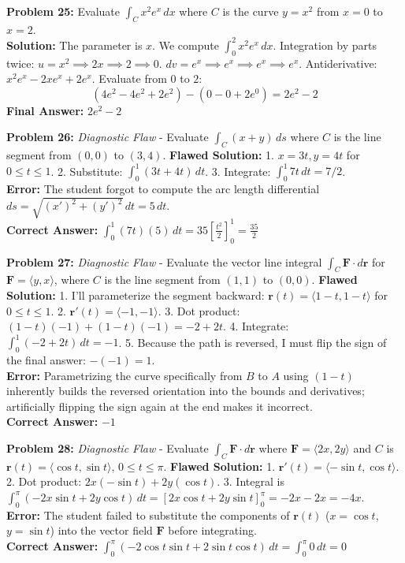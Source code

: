 \documentclass[11pt]{article}
\begin{document}
\textbf{Problem 25:} Evaluate $\int_C x^2e^x \,dx$ where $C$ is the curve $y = x^2$ from $x=0$ to $x=2$.
\\
\textbf{Solution:} The parameter is $x$. We compute $\int_0^2 x^2 e^x \,dx$.
Integration by parts twice: $u=x^2 \implies 2x \implies 2 \implies 0$. $dv=e^x \implies e^x \implies e^x \implies e^x$.
Antiderivative: $x^2e^x - 2xe^x + 2e^x$.
Evaluate from $0$ to $2$:
$$ (4e^2 - 4e^2 + 2e^2) - (0 - 0 + 2e^0) = 2e^2 - 2 $$
\textbf{Final Answer:} $2e^2 - 2$
\vspace{0.5cm}

\textbf{Problem 26:} \textit{Diagnostic Flaw} - Evaluate $\int_C (x+y) \,ds$ where $C$ is the line segment from $(0,0)$ to $(3,4)$. 
\textbf{Flawed Solution:} 1. $x = 3t, y = 4t$ for $0 \le t \le 1$. 2. Substitute: $\int_0^1 (3t + 4t) \,dt$. 3. Integrate: $\int_0^1 7t \,dt = 7/2$.
\\
\textbf{Error:} The student forgot to compute the arc length differential $ds = \sqrt{(x')^2+(y')^2} \,dt = 5 \,dt$. 
\\
\textbf{Correct Answer:} $\int_0^1 (7t)(5) \,dt = 35 \left[ \frac{t^2}{2} \right]_0^1 = \frac{35}{2}$
\vspace{0.5cm}

\textbf{Problem 27:} \textit{Diagnostic Flaw} - Evaluate the vector line integral $\int_C \mathbf{F} \cdot d\mathbf{r}$ for $\mathbf{F} = \langle y, x \rangle$, where $C$ is the line segment from $(1,1)$ to $(0,0)$.
\textbf{Flawed Solution:} 1. I'll parameterize the segment backward: $\mathbf{r}(t) = \langle 1-t, 1-t \rangle$ for $0 \le t \le 1$. 2. $\mathbf{r}'(t) = \langle -1, -1 \rangle$. 3. Dot product: $(1-t)(-1) + (1-t)(-1) = -2 + 2t$. 4. Integrate: $\int_0^1 (-2+2t) \,dt = -1$. 5. Because the path is reversed, I must flip the sign of the final answer: $-(-1) = 1$.
\\
\textbf{Error:} Parametrizing the curve specifically from $B$ to $A$ using $(1-t)$ inherently builds the reversed orientation into the bounds and derivatives; artificially flipping the sign again at the end makes it incorrect. 
\\
\textbf{Correct Answer:} $-1$
\vspace{0.5cm}

\textbf{Problem 28:} \textit{Diagnostic Flaw} - Evaluate $\int_C \mathbf{F} \cdot d\mathbf{r}$ where $\mathbf{F} = \langle 2x, 2y \rangle$ and $C$ is $\mathbf{r}(t) = \langle \cos t, \sin t \rangle$, $0 \le t \le \pi$.
\textbf{Flawed Solution:} 1. $\mathbf{r}'(t) = \langle -\sin t, \cos t \rangle$. 2. Dot product: $2x(-\sin t) + 2y(\cos t)$. 3. Integral is $\int_0^\pi (-2x\sin t + 2y\cos t) \,dt = [2x\cos t + 2y\sin t]_0^\pi = -2x - 2x = -4x$.
\\
\textbf{Error:} The student failed to substitute the components of $\mathbf{r}(t)$ ($x = \cos t$, $y = \sin t$) into the vector field $\mathbf{F}$ before integrating.
\\
\textbf{Correct Answer:} $\int_0^\pi (-2\cos t\sin t + 2\sin t\cos t) \,dt = \int_0^\pi 0 \,dt = 0$
\vspace{0.5cm}
\end{document}
